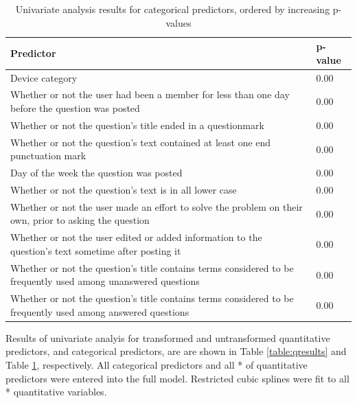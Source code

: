 \documentclass{article}
\begin{document}
\begin{table}[ht]
\centering
\caption{Univariate analysis results for categorical predictors, ordered by increasing p-values} 
\begin{tabular}{|p{12cm}|p{2cm}|}
  \hline
 Predictor & p-value \\ 
  \hline \hline
  Device category & 0.00 \\
  \hline
  Whether or not the user had been a member for less than one day before the question was posted & 0.00 \\ 
  \hline
  Whether or not the question's title ended in a questionmark & 0.00 \\ 
  \hline
  Whether or not the question's text contained at least one end punctuation mark & 0.00 \\ 
  \hline
  Day of the week the question was posted & 0.00 \\ 
  \hline
  Whether or not the question's text is in all lower case & 0.00 \\ 
  \hline
  Whether or not the user made an effort to solve the problem on their own, prior to asking the question & 0.00 \\ 
  \hline
  Whether or not the user edited or added information to the question's text sometime after posting it & 0.00 \\
  \hline
  Whether or not the question's title contains terms considered to be frequently used among unanswered questions & 0.00 \\ 
  \hline
  Whether or not the question's title contains terms considered to be frequently used among answered questions & 0.00 \\ 
   \hline
\end{tabular}
\label{table:cresults}
\end{table}

Results of univariate analyis for transformed and untransformed quantitative predictors, and categorical predictors, are are shown in Table \ref{table:qresults} and Table \ref{table:cresults}, respectively. All categorical predictors and all * of quantitative predictors were entered into the full model. Restricted cubic splines were fit to all * quantitative variables.
\end{document}
